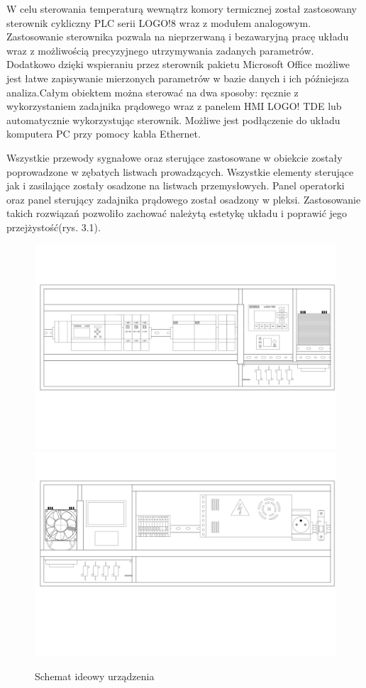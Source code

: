 \documentclass[oneside]{mgr}
\begin{document}
W celu sterowania temperaturą wewnątrz komory termicznej został zastosowany sterownik cykliczny PLC serii LOGO!8 wraz z modułem analogowym. Zastosowanie sterownika pozwala na nieprzerwaną i bezawaryjną pracę układu wraz z możliwością precyzyjnego utrzymywania zadanych parametrów. Dodatkowo dzięki wspieraniu przez sterownik pakietu Microsoft Office możliwe jest łatwe zapisywanie mierzonych parametrów w bazie danych i ich późniejsza analiza.Całym obiektem można sterować na dwa sposoby: ręcznie z wykorzystaniem zadajnika prądowego wraz z panelem HMI LOGO! TDE lub automatycznie wykorzystując sterownik. Możliwe jest podłączenie do układu komputera PC przy pomocy kabla Ethernet. 

Wszystkie przewody sygnałowe oraz sterujące zastosowane w obiekcie zostały poprowadzone w zębatych listwach prowadzących. Wszystkie elementy sterujące jak i zasilające zostały osadzone na listwach przemysłowych. Panel operatorki oraz panel sterujący zadajnika prądowego został osadzony w pleksi. Zastosowanie takich rozwiązań pozwoliło zachować należytą estetykę układu i poprawić jego przejżystość(rys. 3.1).

\begin{figure}
    \centering
    \includegraphics[width=\textwidth]{obiekt_front.jpg}
    \includegraphics[width=\textwidth]{obiekt_back.jpg}
    \caption{Schemat ideowy urządzenia}
\end{figure}
\end{document}

